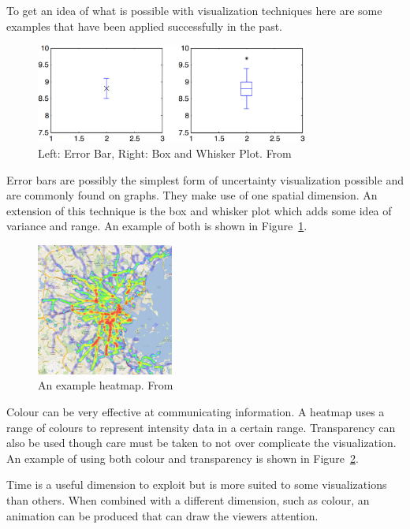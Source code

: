 To get an idea of what is possible with visualization techniques here are some examples that have been applied successfully in the past.

\begin{figure}[H]
    \centering
	\includegraphics[width=0.8\textwidth]{images/background/error_bars.png}
    \caption{Left: Error Bar, Right: Box and Whisker Plot. From \cite{uncertaintyoverview}}
    \label{fig:error_bars}
\end{figure}

Error bars are possibly the simplest form of uncertainty visualization possible and are commonly found on graphs. They make use of one spatial dimension. An extension of this technique is the box and whisker plot which adds some idea of variance and range. An example of both is shown in Figure~\ref{fig:error_bars}.

\begin{figure}[H]
    \centering
	\includegraphics[width=0.4\textwidth]{images/background/heatmap.png}
    \caption{An example heatmap. From \cite{heatmap}}
    \label{fig:heatmap}
\end{figure}

Colour can be very effective at communicating information. A heatmap uses a range of colours to represent intensity data in a certain range. Transparency can also be used though care must be taken to not over complicate the visualization. An example of using both colour and transparency is shown in Figure~\ref{fig:heatmap}.

Time is a useful dimension to exploit but is more suited to some visualizations than others. When combined with a different dimension, such as colour, an animation can be produced that can draw the viewers attention.


